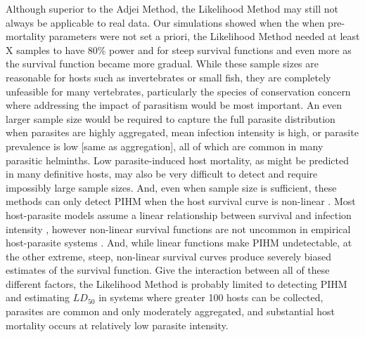 \documentclass[12pt, a4paper]{article}
\begin{document}
Although superior to the Adjei Method, the Likelihood Method may still not
always be applicable to real data.  Our simulations showed when the when pre-
mortality parameters were not set a priori, the Likelihood Method needed at
least X samples to have 80\% power and for steep survival functions and even
more as the survival function became more gradual. While these sample sizes are
reasonable for hosts such as invertebrates or small fish, they are completely
unfeasible for many vertebrates, particularly the species of conservation
concern where addressing the impact of parasitism would be most important. An
even larger sample size would be required to capture the full parasite
distribution when parasites are highly aggregated, mean infection intensity is
high, or parasite prevalence is low [same as aggregation], all of which are
common in many parasitic helminths.  Low parasite-induced host mortality, as
might be predicted in many definitive hosts, may also be very difficult to
detect and require impossibly large sample sizes. And, even when sample size is
sufficient, these methods can only detect PIHM when the host survival curve is
non-linear \citep{Lanciani1989}. Most host-parasite models assume a linear
relationship between survival and infection intensity
\citep{AndersonandMay1978,McCallum2000a}, however non-linear survival functions
are not uncommon in empirical host-parasite systems \citep{Benesh2011}.  And,
while linear functions make PIHM undetectable, at the other extreme, steep,
non-linear survival curves produce severely biased estimates of the survival
function. Give the interaction between all of these different factors, the
Likelihood Method is probably limited to detecting PIHM and estimating
$LD_{50}$ in systems where greater 100 hosts can be collected, parasites are
common and only moderately aggregated, and substantial host mortality occurs at
relatively low parasite intensity.
\end{document}
